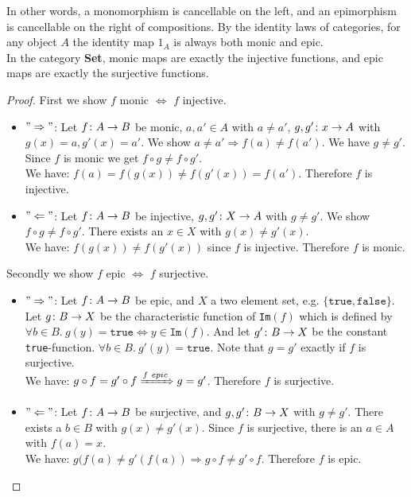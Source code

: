 
In other words, a monomorphism is cancellable on the left, and an epimorphism is cancellable on the right of compositions.
By the identity laws of categories, for any object $A$ the identity map $1_A$ is always both monic and epic.\\
In the category \textbf{Set}, monic maps are exactly the injective functions, and epic maps are exactly the surjective functions.
\begin{proof}
  First we show $f$ monic $\Leftrightarrow$ $f$ injective.
  \begin{itemize}
  \item $"\Rightarrow"$: Let $f \from A \to B$ be monic, $a, a' \in A$ with $a \neq a'$, $g, g' \from {x} \to A$ with $g(x) = a, g'(x) = a'$.
    We show $a \neq a' \Rightarrow f(a) \neq f(a')$.
    We have $g \neq g'$.
    Since $f$ is monic we get $f \circ g \neq f \circ g'$.\\
    We have: $f(a) = f(g(x)) \neq f(g'(x)) = f(a')$. Therefore $f$ is injective.
  \item $"\Leftarrow"$: Let $f \from A \to B$ be injective, $g, g' \from X \to A$ with $g \neq g'$.
    We show $f \circ g \neq f \circ g'$.
    There exists an $x \in X$ with $g(x) \neq g'(x)$.\\
    We have: $f(g(x)) \neq f(g'(x))$ since $f$ is injective.
    Therefore $f$ is monic.
  \end{itemize}
  Secondly we show $f$ epic $\Leftrightarrow$ $f$ surjective.
  \begin{itemize}
  \item $"\Rightarrow"$: Let $f \from A \to B$ be epic, and $X$ a two element set, e.g. $\{ \texttt{true}, \texttt{false}\}$.
    Let $g \from B \to X$ be the characteristic function of \texttt{Im}$(f)$ which is defined by
    $\forall b \in B. \ g(y) = \texttt{true}
    \Leftrightarrow y \in \texttt{Im}(f)$.
    And let $g' \from B \to X$ be the constant \texttt{true}-function.
    $\forall b \in B. \ g'(y) = \texttt{true}$.
    Note that $g = g'$ exactly if $f$ is surjective.\\
    We have: $g \of f = g' \of f \xRightarrow{f \ epic} g = g'$.
    Therefore $f$ is surjective.
  \item $"\Leftarrow"$: Let $f \from A \to B$ be surjective, and $g, g' \from B \to X$ with $g \neq g'$.
    There exists a $b \in B$ with $g(x) \neq g'(x)$.
    Since $f$ is surjective, there is an $a \in A$ with $f(a) = x$.\\
    We have: $g(f(a) \neq g'(f(a)) \Rightarrow g \circ f \neq g' \circ f$.
    Therefore $f$ is epic.
  \end{itemize}
\end{proof}
